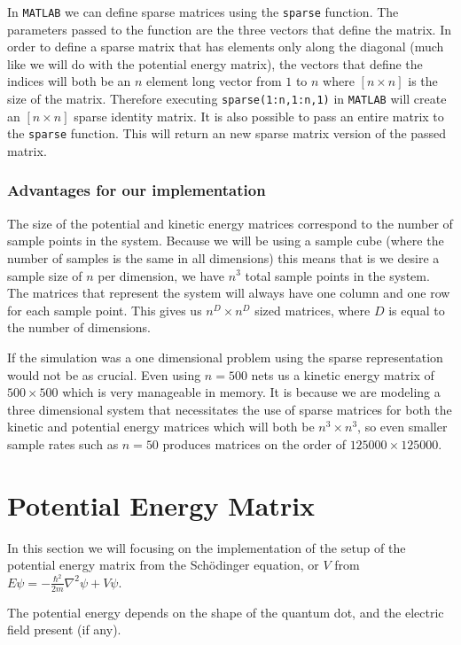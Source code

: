 \documentclass[authoryearcitations]{UoYCSproject}
\begin{document}
In \verb+MATLAB+ we can define sparse matrices using the \verb+sparse+ function. The parameters passed to the function
are the three vectors that define the matrix. 
In order to define a sparse matrix that has elements only along the diagonal (much like we will do with the potential
energy matrix), the vectors that define the indices will both be an $n$ element long vector from $1$ to $n$ where $[n \times n]$
is the size of the matrix. Therefore executing \verb+sparse(1:n,1:n,1)+ in \verb+MATLAB+ will create an $[n \times n]$ sparse
identity matrix. It is also possible to pass an entire matrix to the \verb+sparse+ function. This will return an new sparse
matrix version of the passed matrix. 

\subsubsection{Advantages for our implementation}
The size of the potential and kinetic energy matrices correspond to the number of sample points in the system. 
Because we will be using a sample cube (where the number of samples is the same in all dimensions) this means
that is we desire a sample size of $n$ per dimension, we have $n^3$ total sample points in the system. The 
matrices that represent the system will always have one column and one row for each sample point. This gives
us $n^D \times n^D$ sized matrices, where $D$ is equal to the number of dimensions. 

If the simulation was a one dimensional problem
using the sparse representation would not be as crucial. Even using $n = 500$ nets us a kinetic energy matrix of
$500 \times 500$ which is very manageable in memory. It is because we are modeling a three dimensional system that
necessitates the use of sparse matrices for both the kinetic and potential energy matrices which will both be
$n^3 \times n^3$, so even smaller sample rates such as $n = 50$ produces matrices on the order of $125000 \times 125000$.




\section{Potential Energy Matrix}
\label{sec:potential}
In this section we will focusing on the implementation of the setup of the potential energy matrix
from the Sch\"{o}dinger equation, or $V$ from $E\psi = -\frac{\hbar ^2}{2m}\nabla ^2\psi + V\psi $.

The potential energy depends on the shape of the quantum dot, and the electric field present (if any). 
\end{document}
